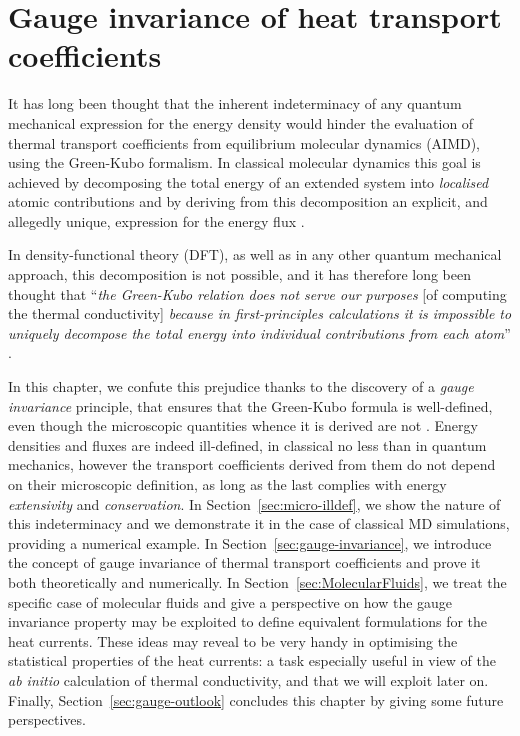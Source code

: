 \chapter{Gauge invariance of heat transport coefficients} \label{ch:gauge-invariance}

It has long been thought that the inherent indeterminacy of any quantum mechanical expression for the energy density would hinder the evaluation of thermal transport coefficients from equilibrium \abinitio molecular dynamics (AIMD), using the Green-Kubo formalism.  
In classical molecular dynamics this goal is achieved by decomposing the total energy of an extended system into \emph{localised} atomic contributions and by deriving from this decomposition an explicit, and allegedly unique, expression for the energy flux \cite{Irving1950}.

In density-functional theory (DFT), as well as in any other quantum mechanical approach, this decomposition is not possible, and it has therefore long been thought that ``\emph{the Green-Kubo relation does not serve our purposes} [of computing the thermal conductivity] \emph{because in first-principles calculations it is impossible to uniquely decompose the total energy into individual contributions from each atom}'' \cite{Stackhouse2010b}. 

In this chapter, we confute this prejudice thanks to the discovery of a \emph{gauge invariance} principle, that ensures that the Green-Kubo formula is well-defined, even though the microscopic quantities whence it is derived are not \cite{Marcolongo2016,Ercole2016}. 
Energy densities and fluxes are indeed ill-defined, in classical no less than in quantum mechanics, however the transport coefficients derived from them do not depend on their microscopic definition, as long as the last complies with energy \emph{extensivity} and \emph{conservation}. 
In Section~\ref{sec:micro-illdef}, we show the nature of this indeterminacy and we demonstrate it in the case of classical MD simulations, providing a numerical example. 
In Section~\ref{sec:gauge-invariance}, we introduce the concept of gauge invariance of thermal transport coefficients and prove it both theoretically and numerically. 
In Section~\ref{sec:MolecularFluids}, we treat the specific case of molecular fluids and give a perspective on how the gauge invariance property may be exploited to define equivalent formulations for the heat currents. 
These ideas may reveal to be very handy in optimising the statistical properties of the heat currents: a task especially useful in view of the \emph{ab initio} calculation of thermal conductivity, and that we will exploit later on. 
Finally, Section~\ref{sec:gauge-outlook} concludes this chapter by giving some future perspectives. 



